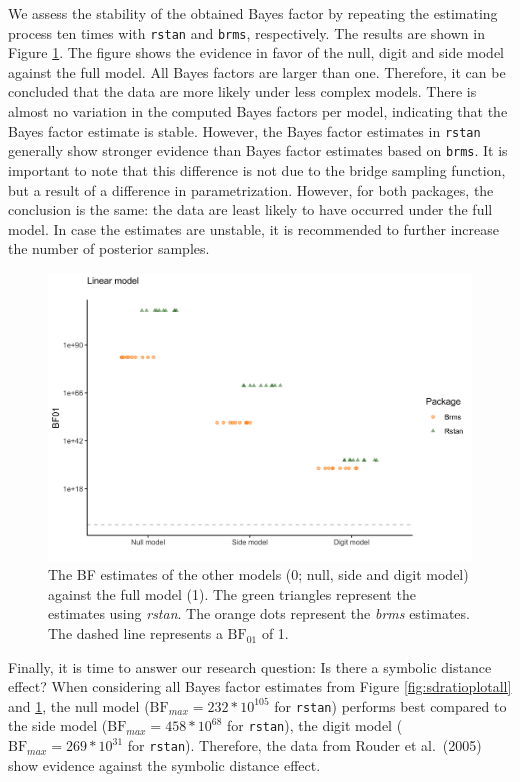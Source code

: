 \documentclass[
  english,
  doc,floatsintext]{apa6}
\begin{document}
We assess the stability of the obtained Bayes factor by repeating the estimating process ten times with \texttt{rstan} and \texttt{brms}, respectively. The results are shown in Figure \ref{fig:bsbfestimatesbrmsrstan}. The figure shows the evidence in favor of the null, digit and side model against the full model. All Bayes factors are larger than one. Therefore, it can be concluded that the data are more likely under less complex models. There is almost no variation in the computed Bayes factors per model, indicating that the Bayes factor estimate is stable. However, the Bayes factor estimates in \texttt{rstan} generally show stronger evidence than Bayes factor estimates based on \texttt{brms}. It is important to note that this difference is not due to the bridge sampling function, but a result of a difference in parametrization. However, for both packages, the conclusion is the same: the data are least likely to have occurred under the full model. In case the estimates are unstable, it is recommended to further increase the number of posterior samples.

\begin{figure}[H]

\includegraphics[width=0.7\linewidth]{Images/Fig17_normalbfplot01} \hfill{}

\caption{The BF estimates of the other models (0; null, side and digit model) against the full model (1). The green triangles represent the estimates using \textit{rstan}. The orange dots represent the \textit{brms} estimates. The dashed line represents a $\text{BF}_{01}$ of 1. }\label{fig:bsbfestimatesbrmsrstan}
\end{figure}

Finally, it is time to answer our research question: Is there a symbolic distance effect? When considering all Bayes factor estimates from Figure \ref{fig:sdratioplotall} and \ref{fig:bsbfestimatesbrmsrstan}, the null model (\(\text{BF}_{max} = 232 * 10^{105}\) for \texttt{rstan}) performs best compared to the side model (\(\text{BF}_{max} = 458 * 10^{68}\) for \texttt{rstan}), the digit model (\(\text{BF}_{max} = 269 * 10^{31}\) for \texttt{rstan}). Therefore, the data from Rouder et al.~(2005) show evidence against the symbolic distance effect.
\end{document}

